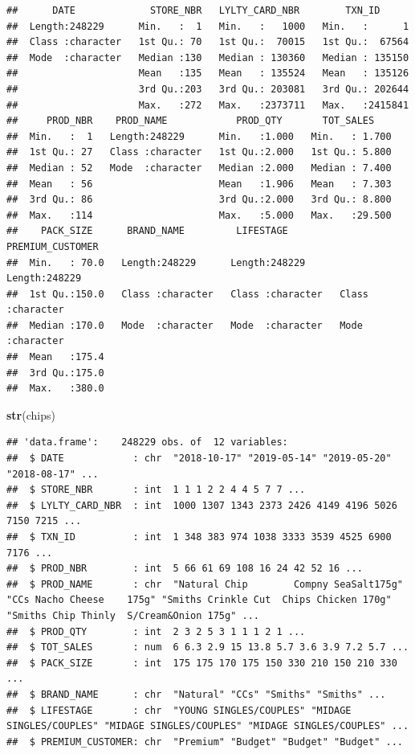 \documentclass[
]{article}
\newenvironment{Shaded}{\begin{snugshade}}{\end{snugshade}}
\newcommand{\FunctionTok}[1]{\textcolor[rgb]{0.13,0.29,0.53}{\textbf{#1}}}
\newcommand{\NormalTok}[1]{#1}
\begin{document}
\begin{verbatim}
##      DATE             STORE_NBR   LYLTY_CARD_NBR        TXN_ID       
##  Length:248229      Min.   :  1   Min.   :   1000   Min.   :      1  
##  Class :character   1st Qu.: 70   1st Qu.:  70015   1st Qu.:  67564  
##  Mode  :character   Median :130   Median : 130360   Median : 135150  
##                     Mean   :135   Mean   : 135524   Mean   : 135126  
##                     3rd Qu.:203   3rd Qu.: 203081   3rd Qu.: 202644  
##                     Max.   :272   Max.   :2373711   Max.   :2415841  
##     PROD_NBR    PROD_NAME            PROD_QTY       TOT_SALES     
##  Min.   :  1   Length:248229      Min.   :1.000   Min.   : 1.700  
##  1st Qu.: 27   Class :character   1st Qu.:2.000   1st Qu.: 5.800  
##  Median : 52   Mode  :character   Median :2.000   Median : 7.400  
##  Mean   : 56                      Mean   :1.906   Mean   : 7.303  
##  3rd Qu.: 86                      3rd Qu.:2.000   3rd Qu.: 8.800  
##  Max.   :114                      Max.   :5.000   Max.   :29.500  
##    PACK_SIZE      BRAND_NAME         LIFESTAGE         PREMIUM_CUSTOMER  
##  Min.   : 70.0   Length:248229      Length:248229      Length:248229     
##  1st Qu.:150.0   Class :character   Class :character   Class :character  
##  Median :170.0   Mode  :character   Mode  :character   Mode  :character  
##  Mean   :175.4                                                           
##  3rd Qu.:175.0                                                           
##  Max.   :380.0
\end{verbatim}

\begin{Shaded}
\begin{Highlighting}[]
\FunctionTok{str}\NormalTok{(chips)}
\end{Highlighting}
\end{Shaded}

\begin{verbatim}
## 'data.frame':    248229 obs. of  12 variables:
##  $ DATE            : chr  "2018-10-17" "2019-05-14" "2019-05-20" "2018-08-17" ...
##  $ STORE_NBR       : int  1 1 1 2 2 4 4 5 7 7 ...
##  $ LYLTY_CARD_NBR  : int  1000 1307 1343 2373 2426 4149 4196 5026 7150 7215 ...
##  $ TXN_ID          : int  1 348 383 974 1038 3333 3539 4525 6900 7176 ...
##  $ PROD_NBR        : int  5 66 61 69 108 16 24 42 52 16 ...
##  $ PROD_NAME       : chr  "Natural Chip        Compny SeaSalt175g" "CCs Nacho Cheese    175g" "Smiths Crinkle Cut  Chips Chicken 170g" "Smiths Chip Thinly  S/Cream&Onion 175g" ...
##  $ PROD_QTY        : int  2 3 2 5 3 1 1 1 2 1 ...
##  $ TOT_SALES       : num  6 6.3 2.9 15 13.8 5.7 3.6 3.9 7.2 5.7 ...
##  $ PACK_SIZE       : int  175 175 170 175 150 330 210 150 210 330 ...
##  $ BRAND_NAME      : chr  "Natural" "CCs" "Smiths" "Smiths" ...
##  $ LIFESTAGE       : chr  "YOUNG SINGLES/COUPLES" "MIDAGE SINGLES/COUPLES" "MIDAGE SINGLES/COUPLES" "MIDAGE SINGLES/COUPLES" ...
##  $ PREMIUM_CUSTOMER: chr  "Premium" "Budget" "Budget" "Budget" ...
\end{verbatim}
\end{document}
